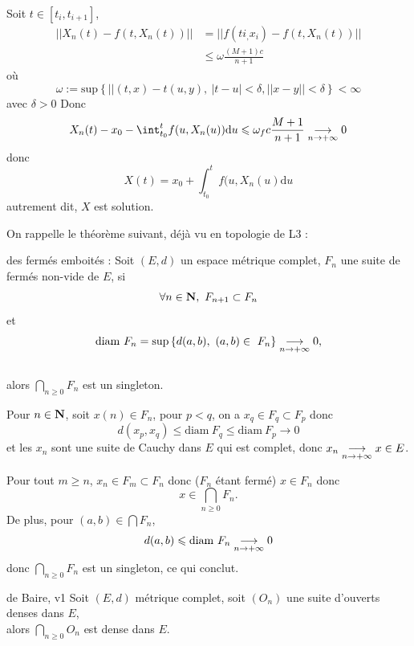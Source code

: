 \documentclass[a4paper,11pt, twoside]{article}
\begin{document}
\begin{Proof}
  Soit $t\in[t_i,t_{i+1}]$,
  \begin{align*}
    ||X_n(t)-f(t,X_n(t))||&=||f(ti_,x_i)-f(t,X_n(t))||\\
    &\leqslant \omega \frac{(M+1)c}{n+1}
  \end{align*}
  où 
  $$\omega :=\mathrm{sup}\left\{||(t,x)-t(u,y),\ |t-u|<\delta, ||x-y||<\delta\right\}<\infty$$
  avec $\delta>0$
  Donc 
  $$X_n(t)-x_0-\int_{t_0}^tf(u,X_n(u))\mathrm du\leqslant \omega_fc\frac{M+1}{n+1}\tend 0$$
  donc 
  $$X(t)=x_0+\int_{t_0}^tf(u,X_n(u)\mathrm du$$
  autrement dit, $X$ est solution.
\end{Proof}





\setcounter{prop}{0}





On rappelle le théorème suivant, déjà vu en topologie de L3 : 

\begin{thC}{des fermés emboités :}
  Soit $(E,d)$ un espace métrique complet, $F_n$ une suite de fermés non-vide de $E$, si
  $$\forall n\in\mathbf N,\ F_{n+1}\subset F_n$$
  et
  $$\mathrm{diam}\ F_n=\mathrm{sup}\left\{d(a,b),\ (a,b)\in\ F_n\right\}\tend 0,$$\\

  alors $\bigcap_{n\geqslant 0}F_n$ est un singleton.
\end{thC}

\begin{Proof}
  Pour $n\in\mathbf N$, soit $x(n)\in F_n$, pour $p<q$, on a $x_q\in F_q\subset F_p$ donc 
  $$d(x_p,x_q)\leqslant \mathrm{diam}\ F_q\leqslant \mathrm{diam}\ F_p\longrightarrow 0$$
  et les $x_n$ sont une suite de Cauchy dans $E$ qui est complet, donc $x_n\underset{n\to+\infty}{\longrightarrow} x\in E$.

  Pour tout $m\geqslant n$, $x_n\in F_m\subset F_n$ donc ($F_n$ étant fermé) $x\in F_n$ donc 
  $$x\in \bigcap_{n\geqslant 0}F_n.$$
  De plus, pour $(a,b)\in \bigcap F_n$, 
  $$d(a,b)\leqslant \mathrm{diam}\ F_n\underset{n\to+\infty}{\longrightarrow} 0$$
  donc $\bigcap_{n\geqslant 0} F_n$ est un singleton, ce qui conclut.
\end{Proof}

\begin{thC}{de Baire, v1}
  Soit $(E,d)$ métrique complet, soit $(O_n)$ une suite d'ouverts denses dans $E$,\\

  alors 
  $\bigcap_{n\geqslant 0}O_n$ est dense dans $E$.
\end{thC}
\end{document}
